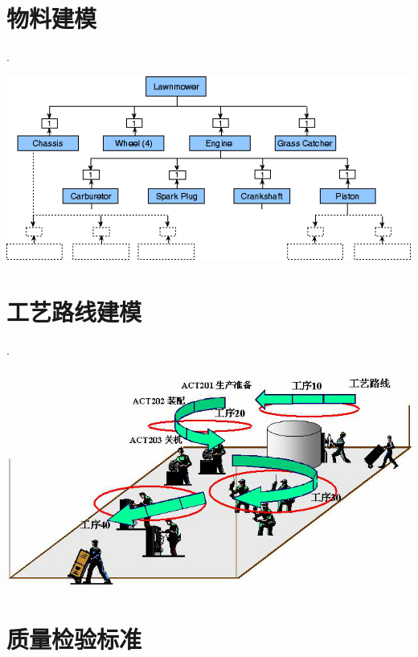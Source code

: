 
\section {物料建模}
        .
        \begin{center}
            \includegraphics[scale=0.6] {bom1.png}
        \end{center}


\section {工艺路线建模}
        .
        \begin{center}
            \includegraphics[scale=0.5] {flow1.png}
        \end{center}

\section {质量检验标准}

\practices

